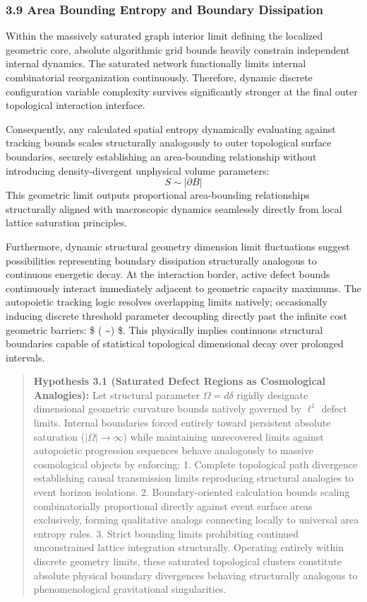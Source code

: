 \documentclass[
]{article}
\begin{document}
\subsubsection{3.9 Area Bounding Entropy and Boundary
Dissipation}\label{area-bounding-entropy-and-boundary-dissipation}

Within the massively saturated graph interior limit defining the
localized geometric core, absolute algorithmic grid bounds heavily
constrain independent internal dynamics. The saturated network
functionally limits internal combinatorial reorganization continuously.
Therefore, dynamic discrete configuration variable complexity survives
significantly stronger at the final outer topological interaction
interface.

Consequently, any calculated spatial entropy dynamically evaluating
against tracking bounds scales structurally analogously to outer
topological surface boundaries, securely establishing an area-bounding
relationship without introducing density-divergent unphysical volume
parameters: \[ S \sim |\partial B| \] This geometric limit outputs
proportional area-bounding relationships structurally aligned with
macroscopic dynamics seamlessly directly from local lattice saturation
principles.

Furthermore, dynamic structural geometry dimension limit fluctuations
suggest possibilities representing boundary dissipation structurally
analogous to continuous energetic decay. At the interaction border,
active defect bounds continuously interact immediately adjacent to
geometric capacity maximums. The autopoietic tracking logic resolves
overlapping limits natively; occasionally inducing discrete threshold
parameter decoupling directly past the infinite cost geometric barriers:
\$ ( \sim {}) \$. This physically
implies continuous structural boundaries capable of statistical
topological dimensional decay over prolonged intervals.

\begin{quote}
\textbf{Hypothesis 3.1 (Saturated Defect Regions as Cosmological
Analogies):} Let structural parameter \(\Omega = d\delta\) rigidly
designate dimensional geometric curvature bounds natively governed by
\(\ell^1\) defect limits. Internal boundaries forced entirely toward
persistent absolute saturation (\(|\Omega| \to \infty\)) while
maintaining unrecovered limits against autopoietic progression sequences
behave analogously to massive cosmological objects by enforcing: 1.
Complete topological path divergence establishing causal transmission
limits reproducing structural analogies to event horizon isolations. 2.
Boundary-oriented calculation bounds scaling combinatorially
proportional directly against event surface areas exclusively, forming
qualitative analogs connecting locally to universal area entropy rules.
3. Strict bounding limits prohibiting continued unconstrained lattice
integration structurally. Operating entirely within discrete geometry
limits, these saturated topological clusters constitute absolute
physical boundary divergences behaving structurally analogous to
phenomenological gravitational singularities.
\end{quote}
\end{document}
